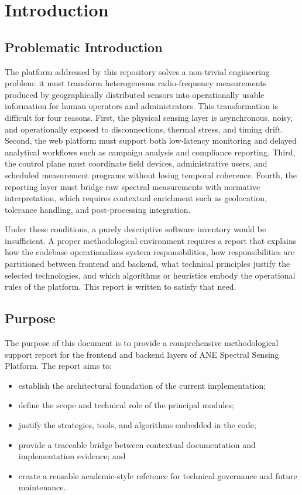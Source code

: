 \documentclass[11pt,a4paper]{article}
\newcommand{\project}{ANE Spectral Sensing Platform}
\begin{document}
\tableofcontents
\newpage

\section{Introduction}

\subsection{Problematic Introduction}
The platform addressed by this repository solves a non-trivial engineering problem: it must transform heterogeneous radio-frequency measurements produced by geographically distributed sensors into operationally usable information for human operators and administrators. This transformation is difficult for four reasons. First, the physical sensing layer is asynchronous, noisy, and operationally exposed to disconnections, thermal stress, and timing drift. Second, the web platform must support both low-latency monitoring and delayed analytical workflows such as campaign analysis and compliance reporting. Third, the control plane must coordinate field devices, administrative users, and scheduled measurement programs without losing temporal coherence. Fourth, the reporting layer must bridge raw spectral measurements with normative interpretation, which requires contextual enrichment such as geolocation, tolerance handling, and post-processing integration.

Under these conditions, a purely descriptive software inventory would be insufficient. A proper methodological environment requires a report that explains how the codebase operationalizes system responsibilities, how responsibilities are partitioned between frontend and backend, what technical principles justify the selected technologies, and which algorithms or heuristics embody the operational rules of the platform. This report is written to satisfy that need.

\subsection{Purpose}
The purpose of this document is to provide a comprehensive methodological support report for the frontend and backend layers of \project. The report aims to:

\begin{itemize}
  \item establish the architectural foundation of the current implementation;
  \item define the scope and technical role of the principal modules;
  \item justify the strategies, tools, and algorithms embedded in the code;
  \item provide a traceable bridge between contextual documentation and implementation evidence; and
  \item create a reusable academic-style reference for technical governance and future maintenance.
\end{itemize}
\end{document}
